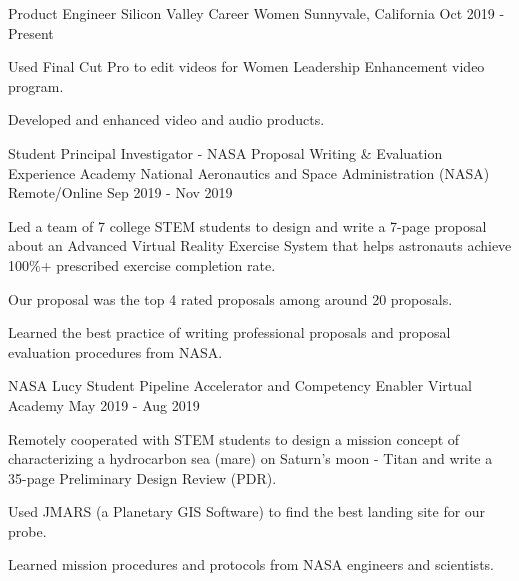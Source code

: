 

\begin{cventries}

  \cventry
    {Product Engineer} %
    {Silicon Valley Career Women} %
    {Sunnyvale, California} %
    {Oct 2019 - Present} %
    {
	\begin{cvitems} %
      	\item Used Final Cut Pro to edit videos for Women Leadership Enhancement video program.
      	\item Developed and enhanced video and audio products.
	\end{cvitems}
    }
    
  \cventry
    {Student Principal Investigator - NASA Proposal Writing \& Evaluation Experience Academy} %
    {National Aeronautics and Space Administration (NASA)} %
    {Remote/Online} %
    {Sep 2019 - Nov 2019} %
    {
	\begin{cvitems} %
      	\item Led a team of 7 college STEM students to design and write a 7-page proposal about an Advanced Virtual Reality Exercise System that helps astronauts achieve 100\%+ prescribed exercise completion rate. 
      	\item Our proposal was the top 4 rated proposals among around 20 proposals.
      	\item Learned the best practice of writing professional proposals and proposal evaluation procedures from NASA.
	\end{cvitems}
    }
   
   \cventry
    {NASA Lucy Student Pipeline Accelerator and Competency Enabler Virtual Academy} %
    {} %
    {} %
    {May 2019 - Aug 2019} %
    {
	\begin{cvitems} %
      	\item Remotely cooperated with STEM students to design a mission concept of characterizing a hydrocarbon sea (mare) on Saturn’s moon - Titan and write a 35-page Preliminary Design Review (PDR). 
      	\item Used JMARS (a Planetary GIS Software) to find the best landing site for our probe.
      	\item Learned mission procedures and protocols from NASA engineers and scientists.
	\end{cvitems}
    }
    

\end{cventries}

